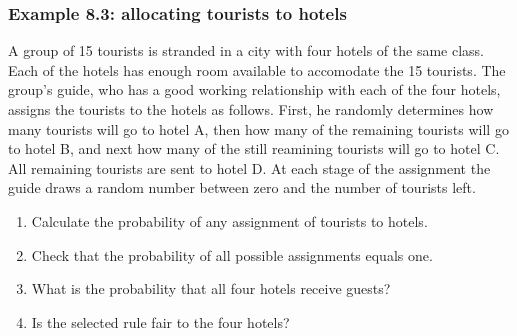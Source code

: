 \begin{frame}
    \frametitle{Example 8.3: allocating tourists to hotels}

    \footnotesize
    \begin{manualProbExample}{8.3}
        A group of 15 tourists is stranded in a city with four hotels of the
        same class. Each of the hotels has enough room available to accomodate
        the 15 tourists. The group's guide, who has a good working relationship
        with each of the four hotels, assigns the tourists to the hotels as
        follows. First, he randomly determines how many tourists will go to
        hotel A, then how many of the remaining tourists will go to hotel B, and
        next how many of the still reamining tourists will go to hotel C. All
        remaining tourists are sent to hotel D. At each stage of the assignment
        the guide draws a random number between zero and the number of tourists
        left.
        \begin{enumerate}[a]
            \item Calculate the probability of any assignment of tourists to
                hotels.
            \item Check that the probability of all possible assignments equals
                one.
            \item What is the probability that all four hotels receive guests?
            \item Is the selected rule fair to the four hotels?
        \end{enumerate}
    \end{manualProbExample}
    \normalsize

\end{frame}

